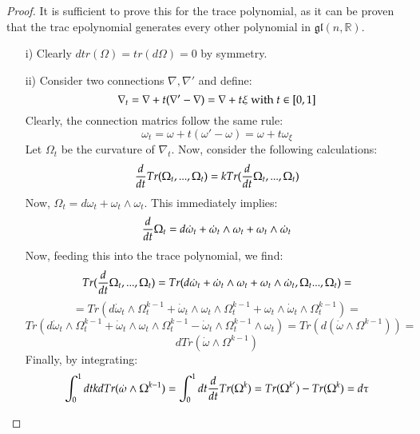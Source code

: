\documentclass[12pt,a4paper]{report}
\theoremstyle{definition}
\theoremstyle{Theorem}
\theoremstyle{break}
\theoremstyle{definition}
\begin{document}
	\begin{proof}
		It is sufficient to prove this for the trace polynomial, as it can be proven that the trac epolynomial generates every other polynomial in $\mathfrak{gl}(n,\mathbb{R})$.\\
		\begin{itemize}
			\item[i)] Clearly $dtr(\Omega)=tr(d\Omega)=0$ by symmetry.
			\item[ii)] Consider two connections $\nabla,\nabla'$ and define:
			$$\nabla_t=\nabla+t(\nabla'-\nabla )=\nabla+t\xi\hbox{ with } t\in[0,1]$$
			Clearly, the connection matrics follow the same rule:
			$$\omega_t=\omega+t(\omega'-\omega)=\omega+t\omega_\xi$$
			Let $\Omega_t$ be the curvature of $\nabla_t$. Now, consider the following calculations:
			$${d\over dt}Tr(\Omega_t,...,\Omega_t)=kTr({d\over dt}\Omega_t,...,\Omega_t)$$
			Now, $\Omega_t=d\omega_t+\omega_t\wedge\omega_t$. This immediately implies:
			$${d\over dt}\Omega_t=d\dot{\omega}_t+\dot{\omega}_t\wedge \omega_t+\omega_t\wedge\dot{\omega}_t$$
			Now, feeding this into the trace polynomial, we find:
			$$Tr({d\over dt}\Omega_t,...,\Omega_t)=Tr(d\dot{\omega}_t+\dot{\omega}_t\wedge \omega_t+\omega_t\wedge\dot{\omega}_t ,\Omega_t...,\Omega_t)=$$
			$$=Tr(d\dot{\omega}_t\wedge \Omega_t^{k-1}+\dot{\omega}_t\wedge \omega_t\wedge \Omega_t^{k-1}+\omega_t\wedge\dot{\omega}_t\wedge \Omega_t^{k-1})=$$
			$$Tr(d\dot{\omega}_t\wedge \Omega_t^{k-1}+\dot{\omega}_t\wedge \omega_t\wedge \Omega_t^{k-1}-\dot{\omega}_t\wedge \Omega_t^{k-1}\wedge \omega_t)=Tr(d(\dot{\omega}\wedge \Omega^{k-1}))=$$
			$$dTr(\dot{\omega}\wedge \Omega^{k-1})$$
			Finally, by integrating:
			$$\int_0^1dt kdTr(\dot{\omega}\wedge \Omega^{k-1})=\int_0^1dt {d\over dt}Tr(\Omega^k)=Tr(\Omega^{k'})-Tr(\Omega^{k})=d\tau$$
		\end{itemize}
	\end{proof}
\end{document}
